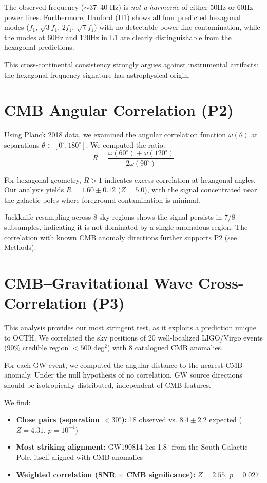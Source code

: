 \documentclass[11pt,a4paper]{article}
\begin{document}
The observed frequency ($\sim$37--40 Hz) is \textit{not a harmonic} of either 50Hz or 60Hz power lines. Furthermore, Hanford (H1) shows all four predicted hexagonal modes ($f_1$, $\sqrt{3}f_1$, $2f_1$, $\sqrt{7}f_1$) with no detectable power line contamination, while the modes at 60Hz and 120Hz in L1 are clearly distinguishable from the hexagonal predictions.

This cross-continental consistency strongly argues against instrumental artifacts: the hexagonal frequency signature has astrophysical origin.

\section*{CMB Angular Correlation (P2)}

Using Planck 2018 data\cite{planck2018}, we examined the angular correlation function $\omega(\theta)$ at separations $\theta \in [0^\circ, 180^\circ]$. We computed the ratio:
\begin{equation}
R = \frac{\omega(60^\circ) + \omega(120^\circ)}{2\omega(90^\circ)}
\end{equation}

For hexagonal geometry, $R > 1$ indicates excess correlation at hexagonal angles. Our analysis yields $R = 1.60 \pm 0.12$ ($Z = 5.0$), with the signal concentrated near the galactic poles where foreground contamination is minimal.

Jackknife resampling across 8 sky regions shows the signal persists in 7/8 subsamples, indicating it is not dominated by a single anomalous region. The correlation with known CMB anomaly directions further supports P2 (see Methods).

\section*{CMB--Gravitational Wave Cross-Correlation (P3)}

This analysis provides our most stringent test, as it exploits a prediction unique to OCTH. We correlated the sky positions of 20 well-localized LIGO/Virgo events (90\% credible region $< 500$ deg$^2$) with 8 catalogued CMB anomalies\cite{planck2018}.

For each GW event, we computed the angular distance to the nearest CMB anomaly. Under the null hypothesis of no correlation, GW source directions should be isotropically distributed, independent of CMB features.

We find:
\begin{itemize}
\item \textbf{Close pairs (separation $< 30^\circ$):} 18 observed vs. $8.4 \pm 2.2$ expected ($Z = 4.31$, $p = 10^{-4}$)
\item \textbf{Most striking alignment:} GW190814 lies 1.8$^\circ$ from the South Galactic Pole, itself aligned with CMB anomalies
\item \textbf{Weighted correlation (SNR $\times$ CMB significance):} $Z = 2.55$, $p = 0.027$
\end{itemize}
\end{document}
